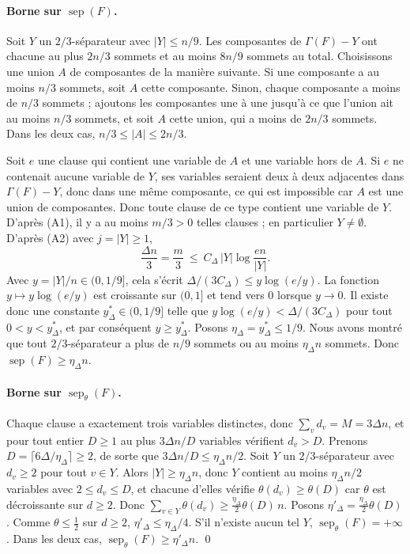\documentclass[11pt,a4paper]{article}
\theoremstyle{definition}
\theoremstyle{remark}
\newcommand{\sep}{\operatorname{sep}}
\newcommand{\sepw}{\operatorname{sep}_{\theta}}
\newcommand{\Gr}{\Gamma}
\begin{document}
\paragraph{Borne sur $\sep(F)$.} Soit $Y$ un $2/3$-séparateur avec $|Y|\le n/9$. Les
composantes de $\Gr(F)-Y$ ont chacune au plus $2n/3$ sommets et au moins $8n/9$ sommets au
total. Choisissons une union $A$ de composantes de la manière suivante. Si une composante a
au moins $n/3$ sommets, soit $A$ cette composante. Sinon, chaque composante a moins de $n/3$
sommets ; ajoutons les composantes une à une jusqu'à ce que l'union ait au moins $n/3$
sommets, et soit $A$ cette union, qui a moins de $2n/3$ sommets. Dans les deux cas,
$n/3\le|A|\le2n/3$.

Soit $e$ une clause qui contient une variable de $A$ et une variable hors de $A$. Si $e$ ne
contenait aucune variable de $Y$, ses variables seraient deux à deux adjacentes dans
$\Gr(F)-Y$, donc dans une même composante, ce qui est impossible car $A$ est une union de
composantes. Donc toute clause de ce type contient une variable de $Y$. D'après (A1), il y a
au moins $m/3>0$ telles clauses ; en particulier $Y\ne\emptyset$. D'après (A2) avec
$j=|Y|\ge1$,
\[
\frac{\Delta n}{3}=\frac m3\ \le\ C_\Delta\,|Y|\log\frac{en}{|Y|} .
\]
Avec $y=|Y|/n\in(0,1/9]$, cela s'écrit $\Delta/(3C_\Delta)\le y\log(e/y)$. La fonction
$y\mapsto y\log(e/y)$ est croissante sur $(0,1]$ et tend vers $0$ lorsque $y\to0$. Il existe
donc une constante $y^*_\Delta\in(0,1/9]$ telle que $y\log(e/y)<\Delta/(3C_\Delta)$ pour tout
$0<y<y^*_\Delta$, et par conséquent $y\ge y^*_\Delta$. Posons
$\eta_\Delta=y^*_\Delta\le1/9$. Nous avons montré que tout $2/3$-séparateur a plus de $n/9$
sommets ou au moins $\eta_\Delta n$ sommets. Donc $\sep(F)\ge\eta_\Delta n$.

\paragraph{Borne sur $\sepw(F)$.} Chaque clause a exactement trois variables distinctes,
donc $\sum_vd_v=M=3\Delta n$, et pour tout entier $D\ge1$ au plus $3\Delta n/D$ variables
vérifient $d_v>D$. Prenons $D=\lceil6\Delta/\eta_\Delta\rceil\ge2$, de sorte que
$3\Delta n/D\le\eta_\Delta n/2$. Soit $Y$ un $2/3$-séparateur avec $d_v\ge2$ pour tout
$v\in Y$. Alors $|Y|\ge\eta_\Delta n$, donc $Y$ contient au moins $\eta_\Delta n/2$
variables avec $2\le d_v\le D$, et chacune d'elles vérifie $\theta(d_v)\ge\theta(D)$ car
$\theta$ est décroissante sur $d\ge2$. Donc
$\sum_{v\in Y}\theta(d_v)\ge\frac{\eta_\Delta}{2}\theta(D)\,n$. Posons
$\eta'_\Delta=\frac{\eta_\Delta}{2}\theta(D)$. Comme $\theta\le\frac12$ sur $d\ge2$,
$\eta'_\Delta\le\eta_\Delta/4$. S'il n'existe aucun tel $Y$, $\sepw(F)=+\infty$. Dans les
deux cas, $\sepw(F)\ge\eta'_\Delta n$. \qed
\end{document}
